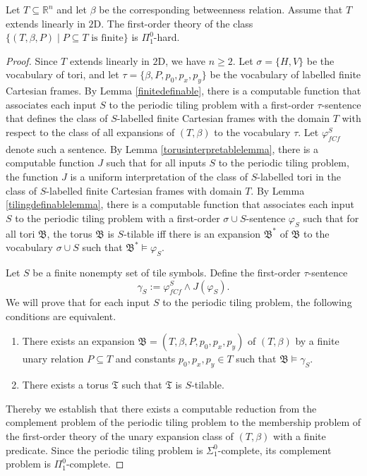 \documentclass{LMCS}
\theoremstyle{plain}
\newcommand{\rsq}{\mathbb{R}^n}
\newcommand{\mf}{\mathfrak}
\newcommand{\mi}{\mathit}
\begin{document}
%
\begin{thm}
%
Let $T\subseteq \rsq$ and let $\beta$ be the corresponding betweenness relation.
%
Assume that $T$ extends linearly in $\mathrm{2D}$. The
first-order theory of the class $\{(T,\beta,P)\mid P\subseteq T\text{ is finite}\}$ is $\Pi^0_1$-hard.
% 
\end{thm}
%
%
%
\begin{proof}
%
Since $T$ extends linearly in $\mathrm{2D}$, we have $n\geq 2$.
%
Let $\sigma=\{H,V\}$ be the vocabulary of tori, and let $\tau=\{\beta,P,p_0,p_x,p_y\}$ be the vocabulary of labelled
%
finite Cartesian frames.
%
By Lemma \ref{finitedefinable},
%
there is a computable function that associates each input $S$ to the periodic tiling problem with a first-order $\tau$-sentence that
%
defines the class of $S$-labelled finite Cartesian frames with the domain $T$ with respect to the
%
class of all expansions of $(T,\beta)$ to the vocabulary $\tau$. Let $\varphi^S_{\mi{fCf}}$ denote such a sentence.
%
By Lemma \ref{torusinterpretablelemma}, there is a computable function $J$ such that 
%
for all inputs $S$ to the periodic tiling problem, the function $J$ 
%
is a uniform interpretation of the class of $S$-labelled tori in the class of $S$-labelled 
%
finite Cartesian frames with domain $T$.
%
By Lemma \ref{tilingdefinablelemma}, there  is a computable function that associates each input $S$ to the periodic tiling problem
%
with a first-order $\sigma\cup S$-sentence $\varphi_S$ such that
%
for all tori $\mf{B}$, the torus $\mf{B}$ is $S$-tilable iff there is an
%
expansion $\mf{B}^*$ of $\mf{B}$ to the
%
vocabulary $\sigma\cup S$
%
such that $\mf{B}^*\models\varphi_{S}$.
%
%

Let $S$ be a finite nonempty set of tile symbols. Define the first-order $\tau$-sentence
\[
\gamma_S:=\varphi_{\mi{fCf}}^S\wedge J(\varphi_S).
\]
We will prove that for each input $S$ to the periodic tiling problem, the following conditions are equivalent.
\begin{enumerate}
\item There exists an expansion $\mf{B}=(T,\beta,P,p_0,p_x,p_y)$ of $(T,\beta)$ by a finite unary relation $P\subseteq T$ and constants $p_0,p_x,p_y\in T$ such that  $\mf{B}\models\gamma_S$.
\item There exists a torus $\mf{T}$ such that $\mf{T}$ is $S$-tilable.
\end{enumerate}
%
Thereby we establish that there exists a computable reduction from the complement problem of the periodic tiling problem to the membership problem of the first-order theory of the unary expansion class of $(T,\beta)$ with a
%
finite predicate. Since the periodic tiling problem is $\Sigma^0_1$-complete, its complement problem is $\Pi^0_1$-complete.



\end{proof}
\end{document}
